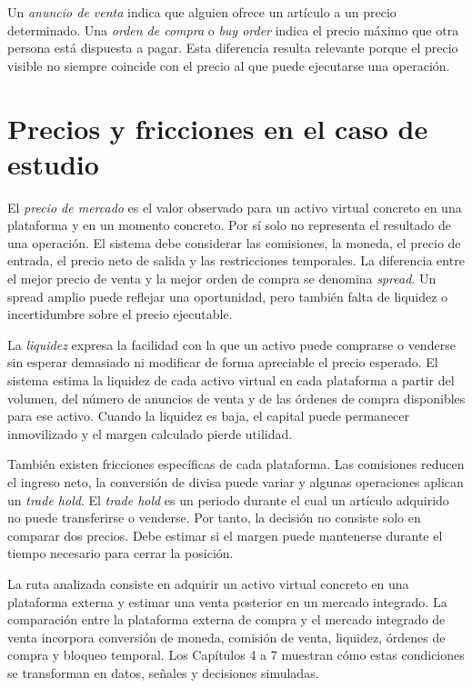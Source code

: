 Un \emph{anuncio de venta} indica que alguien ofrece un artículo a un precio determinado. Una \emph{orden de compra} o \textit{buy order} indica el precio máximo que otra persona está dispuesta a pagar. Esta diferencia resulta relevante porque el precio visible no siempre coincide con el precio al que puede ejecutarse una operación.

\section{Precios y fricciones en el caso de estudio}

El \emph{precio de mercado} es el valor observado para un activo virtual concreto en una plataforma y en un momento concreto. Por sí solo no representa el resultado de una operación. El sistema debe considerar las comisiones, la moneda, el precio de entrada, el precio neto de salida y las restricciones temporales. La diferencia entre el mejor precio de venta y la mejor orden de compra se denomina \emph{spread}. Un spread amplio puede reflejar una oportunidad, pero también falta de liquidez o incertidumbre sobre el precio ejecutable.

La \emph{liquidez} expresa la facilidad con la que un activo puede comprarse o venderse sin esperar demasiado ni modificar de forma apreciable el precio esperado. El sistema estima la liquidez de cada activo virtual en cada plataforma a partir del volumen, del número de anuncios de venta y de las órdenes de compra disponibles para ese activo. Cuando la liquidez es baja, el capital puede permanecer inmovilizado y el margen calculado pierde utilidad.

También existen fricciones específicas de cada plataforma. Las comisiones reducen el ingreso neto, la conversión de divisa puede variar y algunas operaciones aplican un \textit{trade hold}. El \textit{trade hold} es un periodo durante el cual un artículo adquirido no puede transferirse o venderse. Por tanto, la decisión no consiste solo en comparar dos precios. Debe estimar si el margen puede mantenerse durante el tiempo necesario para cerrar la posición.

La ruta analizada consiste en adquirir un activo virtual concreto en una plataforma externa y estimar una venta posterior en un mercado integrado. La comparación entre la plataforma externa de compra y el mercado integrado de venta incorpora conversión de moneda, comisión de venta, liquidez, órdenes de compra y bloqueo temporal. Los Capítulos 4 a 7 muestran cómo estas condiciones se transforman en datos, señales y decisiones simuladas.
